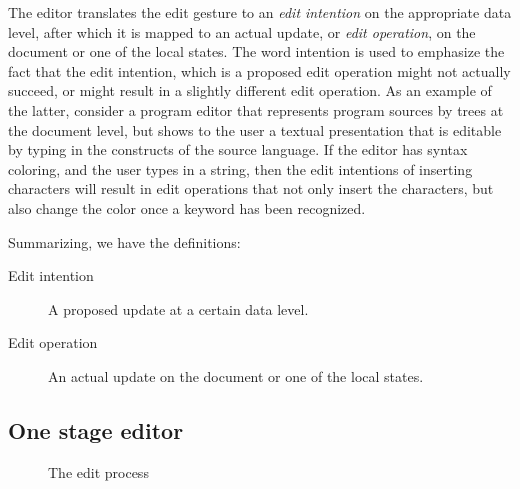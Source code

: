\documentclass[twoside,epsf]{report}
\begin{document}
The editor translates the edit gesture to an {\em edit intention} on the appropriate data level, after which it is mapped to an actual update, or {\em edit operation}, on the document or one of the local states. The word intention is used to emphasize the fact that the edit intention, which is a proposed edit operation might not actually succeed, or might result in a slightly different edit operation. As an example of the latter, consider a program editor that represents program sources by trees at the document level, but shows to the user a textual presentation that is editable by typing in the constructs of the source language. If the editor has syntax coloring, and the user types in a string, then the edit intentions of inserting characters will result in edit operations that not only insert the characters, but also change the color once a keyword has been recognized. 

Summarizing, we have the definitions:
 \begin{description}
 
 \item[Edit intention]
A proposed update at a certain data level.
 \item[Edit operation ]
An actual update on the document or one of the local states.
 \end{description}

\subsection{One stage editor}
\label{subsectsingleedit}
\begin{figure}
\begin{small}
\begin{center}
\begin{center}
\begin{small}
\bigskip \noindent
{}
\end{small}
\end{center}\caption{ The edit process}\label{editprocess} 
\end{center}
\end{small}
\end{figure}
\end{document}
